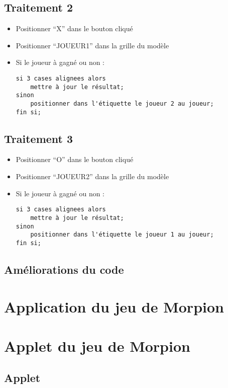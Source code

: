 \documentclass{article}
\begin{document}
	\subsection{Traitement 2}
	\begin{itemize}
		\item Positionner ``X'' dans le bouton cliqué
		\item Positionner ``JOUEUR1'' dans la grille du modèle
		\item Si le joueur à gagné ou non :  
\begin{lstlisting}[language=Algo, numbers=none]
si 3 cases alignees alors
	mettre à jour le résultat;
sinon
	positionner dans l'étiquette le joueur 2 au joueur;
fin si;
\end{lstlisting}
	\end{itemize}
	\subsection{Traitement 3}
	\begin{itemize}
		\item Positionner ``O'' dans le bouton cliqué
		\item Positionner ``JOUEUR2'' dans la grille du modèle
		\item Si le joueur à gagné ou non :
			
\begin{lstlisting}[language=Algo, numbers=none]
si 3 cases alignees alors
	mettre à jour le résultat;
sinon
	positionner dans l'étiquette le joueur 1 au joueur;
fin si;
\end{lstlisting}
	\end{itemize}

	\subsection{Améliorations du code}
	
	\section{Application du jeu de Morpion}
	
	\section{Applet du jeu de Morpion}
	\subsection{Applet}
	
\end{document}

